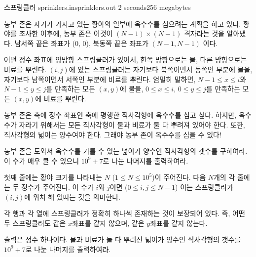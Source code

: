 \begin{problem}{스프링클러}
	{sprinklers.in}{sprinklers.out}
	{2 seconds}{256 megabytes}{}
	
	농부 존은 자기가 가지고 있는 황야의 일부에 옥수수를 심으려는 계획을 하고 있다. 황야를 조사한 이후에, 농부 존은 이것이 $(N-1) \times (N-1)$ 격자라는 것을 알아냈다. 남서쪽 끝은 좌표가 (0, 0), 북동쪽 끝은 좌표가 $(N-1, N-1)$ 이다.
	
	어떤 정수 좌표에 양방향 스프링클러가 있어서, 한쪽 방향으로는 물, 다른 방향으로는 비료를 뿌린다. $(i, j)$에 있는 스프링클러는 자기보다 북쪽이면서 동쪽인 부분에 물을, 자기보다 남쪽이면서 서쪽인 부분에 비료를 뿌린다. 엄밀히 말하면, $N-1 \le x \le i$와 $N-1 \le y \le j$를 만족하는 모든 $(x, y)$에 물을, $0 \le x \le i$, $0 \le y \le j$를 만족하는 모든 $(x, y)$에 비료를 뿌린다.
	
	
	농부 존은 축에 정수 좌표인 축에 평행한 직사각형에 옥수수를 심고 싶다. 하지만, 옥수수가 자라기 위해서는 모든 직사각형이 물과 비료가 둘 다 뿌려져 있어야 한다. 또한, 직사각형의 넓이는 양수여야 한다. 그래야 농부 존이 옥수수를 심을 수 있다!
	
	농부 존을 도와서 옥수수를 기를 수 있는 넓이가 양수인 직사각형의 갯수를 구하여라. 이 수가 매우 클 수 있으니 $10^9 + 7$로 나눈 나머지를 출력하여라.
	
	
	\InputFile
	
	첫째 줄에는 황야 크기를 나타내는 $N$ ($1 \le N \le 10^5$)이 주어진다. 다음 $N$개의 각 줄에는 두 정수가 주어진다. 이 수가 $i$와 $j$이면 ($0 \le i,j \le N-1$) 이는 스프링클러가 $(i, j)$에 위치 해 있따는 것을 의미한다.
	
	각 행과 각 열에 스프링클러가 정확히 하나씩 존재하는 것이 보장되어 있다. 즉, 어떤 두 스프링클러도 같은 $x$좌표를 같지 않으며, 같은 $y$좌표를 같지 않는다.

	\OutputFile
	
	출력은 정수 하나이다. 물과 비료가 둘 다 뿌려진 넓이가 양수인 직사각형의 갯수를 $10^9+7$로 나눈 나머지를 출력하여라.
	
	\Examples
		
	\begin{example}
	\end{example}

	
	
	
\end{problem}

